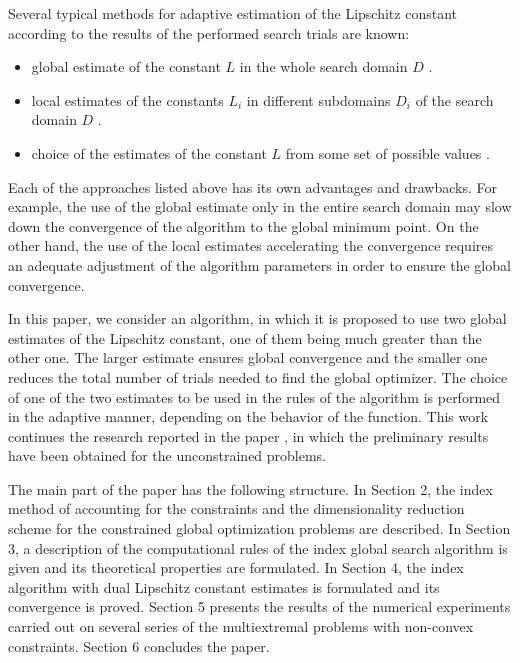 \documentclass[preprint]{elsarticle}
\begin{document}
		Several typical methods for adaptive estimation of the Lipschitz constant according to the results of the performed search trials are known:
\begin{itemize}[]
  \item global estimate of the constant $L$ in the whole search domain $D$ \cite{Strongin2000,Pinter1996,Horst1996}.
  \item local estimates of the constants $L_i$ in different subdomains $D_i$ of the search domain $D$ \cite{Kvasov2003, Sergeyev2010, Sergeyev2016}.
	\item choice of the estimates of the constant $L$ from some set of possible values \cite{Jones2009,Jones1993, Gablonsky2001,Sergeyev2006}.
\end{itemize}

	Each of the approaches listed above has its own advantages and drawbacks. For example, the use of the global estimate only in the entire search domain may slow down the convergence of the algorithm to the global minimum point. On the other hand, the use of the local estimates accelerating the convergence requires an adequate adjustment of the algorithm parameters in order to ensure the global convergence. 

	In this paper, we consider an algorithm, in which it is proposed to use two global estimates of the Lipschitz constant, one of them being much greater than the other one. The larger estimate ensures global convergence and the smaller one reduces the total number of trials needed to find the global optimizer. The choice of one of the two estimates to be used in the rules of the algorithm is performed in the adaptive manner, depending on the behavior of the function. This work continues the research reported in the paper 
	\cite{NUMTA2019},
in which the preliminary results have been obtained for the unconstrained problems.
	
	The main part of the paper has the following structure. In Section 2, the index method of accounting for the constraints and the dimensionality reduction scheme for the constrained global optimization problems are described. In Section 3, a description of the computational rules of the index global search algorithm is given and its theoretical properties are formulated. In Section 4, the index algorithm with dual Lipschitz constant estimates is formulated and its convergence is proved. Section 5 presents the results of the numerical experiments carried out on several series of the multiextremal problems with non-convex constraints. Section 6 concludes the paper.
\end{document}
